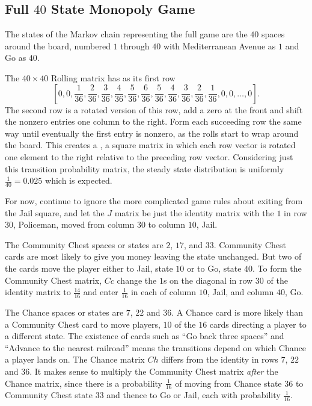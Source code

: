\documentclass[12pt]{article}
\begin{document}
\subsection*{Full \( 40 \) State Monopoly Game}

The states of the Markov chain representing the full game are the \( 40 \)
spaces around the board, numbered \( 1 \) through \( 40 \) with
Mediterranean Avenue as \( 1 \) and Go as \( 40 \).

The \( 40 \times 40 \) Rolling matrix has as its first row
\[
    [0, 0, \frac{1}{36}, \frac{2}{36},\frac{3}{36},\frac{4}{36},\frac{5}
    {36},\frac{6}{36}, \frac{5}{36},\frac{4}{36},\frac{3}{36},\frac{2}{36},\frac
    {1}{36}, 0, 0, \dots, 0].
\] The second row is a rotated version of this row, add a zero at the
front and shift the nonzero entries one column to the right.  Form each
succeeding row the same way until eventually the first entry is nonzero,
as the rolls start to wrap around the board.  This creates a %
%
, a square matrix in which each row vector is rotated one element to the
right relative to the preceding row vector.  Considering just this
transition probability matrix, the steady state distribution is
uniformly \( \frac{1}{40} = 0.025 \) which is expected.

For now, continue to ignore the more complicated game rules about
exiting from the Jail square, and let the \( J \) matrix be just the
identity matrix with the \( 1 \) in row \( 30 \), Policeman, moved from
column \( 30 \) to column \( 10 \), Jail.

The Community Chest spaces or states are \( 2 \), \( 17 \), and \( 33 \).
Community Chest cards are most likely to give you money leaving the
state unchanged.  But two of the cards move the player either to Jail,
state \( 10 \) or to Go, state \( 40 \).  To form the Community Chest
matrix, \( \mathit{Cc} \) change the \( 1 \)s on the diagonal in row \(
30 \) of the identity matrix to \( \frac{14}{16} \) and enter \( \frac{1}
{16} \) in each of column \( 10 \), Jail, and column \( 40 \), Go.

The Chance spaces or states are \( 7 \), \( 22 \) and \( 36 \).  A
Chance card is more likely than a Community Chest card to move players, \(
10 \) of the \( 16 \) cards directing a player to a different state. The
existence of cards such as ``Go back three spaces'' and ``Advance to the
nearest railroad'' means the transitions depend on which Chance a player
lands on.  The Chance matrix \( \mathit{Ch} \) differs from the identity
in rows \( 7 \), \( 22 \) and \( 36 \).  It makes sense to multiply the
Community Chest matrix \emph{after} the Chance matrix, since there is a
probability \( \frac{1}{16} \) of moving from Chance state \( 36 \) to
Community Chest state \( 33 \) and thence to Go or Jail, each with
probability \( \frac{1}{16} \).
\end{document}
